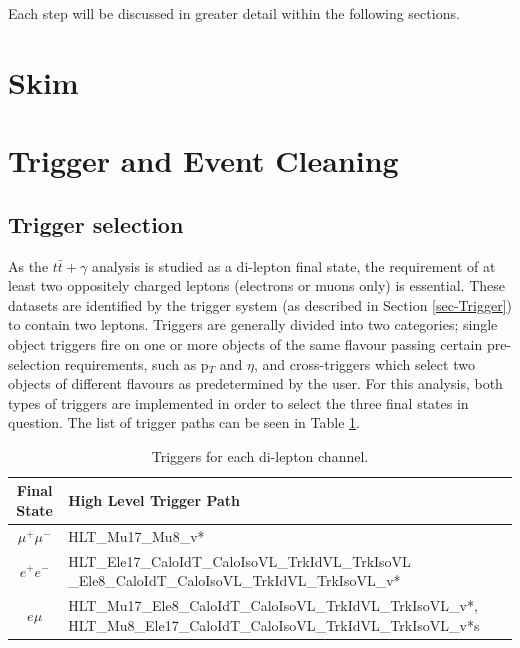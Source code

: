 Each step will be discussed in greater detail within the following sections. 

\section{Skim}

\section{Trigger and Event Cleaning} \label{sec-TriggerAndEventCleaning}

\subsection{Trigger selection}

As the $t\bar{t}+\gamma$ analysis is studied as a di-lepton final state, the requirement of at least two oppositely charged leptons (electrons or muons only) is essential. These datasets are identified by the trigger system (as described in Section \ref{sec-Trigger}) to contain two leptons. Triggers are generally divided into two categories; single object triggers fire on one or more objects of the same flavour passing certain pre-selection requirements, such as p$_T$ and $\eta$, and cross-triggers which select two objects of different flavours as predetermined by the user. For this analysis, both types of triggers are implemented in order to select the three final states in question. The list of trigger paths can be seen in Table \ref{tab-HLTriggers}. 

\begin{table} \label{tab-HLTriggers}
\begin{center}
\begin{tabular}{|c|p{11.5cm}|}
\hline
	\textbf{Final State} & \textbf{High Level Trigger Path} \\
\hline
	$\mu^+\mu^-$ & HLT\_Mu17\_Mu8\_v* \\
	$e^+e^-$ & HLT\_Ele17\_CaloIdT\_CaloIsoVL\_TrkIdVL\_TrkIsoVL
				\_Ele8\_CaloIdT\_CaloIsoVL\_TrkIdVL\_TrkIsoVL\_v* \\
	$e\mu$ & HLT\_Mu17\_Ele8\_CaloIdT\_CaloIsoVL\_TrkIdVL\_TrkIsoVL\_v*, HLT\_Mu8\_Ele17\_CaloIdT\_CaloIsoVL\_TrkIdVL\_TrkIsoVL\_v*s \\
\hline	
\end{tabular}
\caption{Triggers for each di-lepton channel.}
\end{center}
\end{table}

